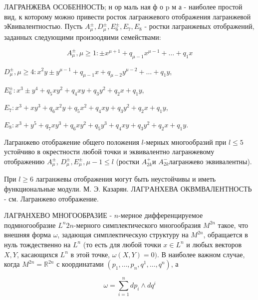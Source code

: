 \documentclass[10pt]{article}
\begin{document}
ЛАГРАНЖЕВА ОСОБЕННОСТЬ; н ор маль ная ф о $\mathrm{p}$ м а - наиболее простой вид, к которому можно привести росток лагранжевого отображения лагранжевой эКвивалентностью. Пусть $A_{\mu}^{ \pm}, D_{\mu}^{ \pm}, E_{6}^{ \pm}, E_{7}, E_{8}$ - ростки лагранжевых отображений, заданных следующими произоодяими семействами:



\[

A_{\mu}^{ \pm}, \mu \geqslant 1: \pm x^{\mu+1}+q_{\mu-1} x^{\mu-1}+\ldots+q_{1} x

\]



$D_{\mu}^{ \pm}, \mu \geqslant 4: x^{2} y \pm y^{\mu-1}+q_{\mu-1} x+q_{\mu-2} y^{\mu-2}+\ldots+q_{1} y$,



$E_{6}^{ \pm}: x^{3} \pm y^{4}+q_{5} x y^{2}+q_{4} x y+q_{3} y^{2}+q_{2} x+q_{1} y$,



$E_{7}: x^{3}+x y^{3}+q_{6} x^{2} y+q_{5} x^{2}+q_{4} x y+q_{3} y^{2}+q_{2} x+q_{1} y$,



$E_{8}: x^{3}+y^{5}+q_{7} x y^{3}+q_{6} x y^{2}+q_{5} y^{3}+q_{4} x y+q_{3} y^{2}+q_{2} x+q_{1} y$.



Лагранжево отображение общего положения $l$-мерных многообразий при $l \leqslant 5$ устойчиво в окрестности любой точки и эквивалентно лагранжевому отображению $A_{\mu}^{ \pm}$, $D_{\mu}^{ \pm}, E_{\mu}^{ \pm}, \mu-1 \leqslant l$ (ростки $A_{2 k}^{+}$и $A_{2 k}^{-}$лагранжево эквивалентны).



При $l \geqslant 6$ лагранжевы отображения могут быть неустойчивы и иметь функциональные модули. $М$. Э. Казарян. ЛАГPАНХЕВА ОКВМВАЛЕНТНОСТЬ - см. Лагранжево отображение.



ЛАГРАНХЕВО МНОГООБРАЗИЕ - $n$-мерное дифференцируемое подмногообразие $L^{n} 2 n$-мерного симплектического многообразия $M^{2 n}$ такое, что внешняя форма $\omega$, задающая симплектическую структуру на $M^{2 n}$, обращается в нуль тождественно на $L^{n}$ (то есть для любой точки $x \in L^{n}$ и любых векторов $X, Y$, касающихся $L^{n}$ в этой точке, $\omega(X, Y)=0)$. В наиболее важном случае, когда $M^{2 n}=\mathbb{R}^{2 n}$ с координатами $\left(p_{1}, \ldots, p_{n}, q^{1}, \ldots, q^{n}\right)$, а



\[

\omega=\sum_{i=1}^{n} d p_{i} \wedge d q^{i}

\]
\end{document}
